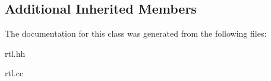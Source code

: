 \subsection*{Additional Inherited Members}


The documentation for this class was generated from the following files\+:\begin{DoxyCompactItemize}
\item 
rtl.\+hh\item 
rtl.\+cc\end{DoxyCompactItemize}
